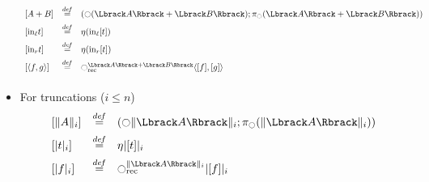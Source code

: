 \begin{itemize}
\[
\begin{array}{lcl}
\left[  A+B \right] &\defeq& \left( \modal(\Lbrack A \Rbrack + \Lbrack B
                        \Rbrack); \pi_\modal(\Lbrack A \Rbrack + \Lbrack B
                        \Rbrack)\right)\\[0.5em]
\left[  \mathrm{in}_\ell t \right] &\defeq& \eta (\mathrm{in}_\ell [t]) \\[0.5em]
\left[  \mathrm{in}_r t \right] &\defeq& \eta (\mathrm{in}_r [t]) \\[0.5em]
\left[ \langle f ,g\rangle\right] &\defeq& \modal_{\mathrm{rec}}^{\Lbrack A\Rbrack +
                                      \Lbrack B\Rbrack} \langle
                                      [f],[g]\rangle\\[0.5em]
\end{array}
\]
\item For truncations ($i\leqslant n$)
\[
\begin{array}{lcl}
  \left[  \|A\|_i \right] &\defeq& (\modal \| \Lbrack A\Rbrack  \|_i;
                                   \pi_\modal(\| \Lbrack A\Rbrack
                                   \|_i)) \\[0.5em]
  \left[ |t|_i \right] &\defeq& \eta |[t]|_i \\[0.5em]
  \left[ |f|_i \right] &\defeq& \modal_{\mathrm{rec}}^{\| \Lbrack
                                  A\Rbrack  \|_i} | [f] |_i
\end{array}
\]

\end{itemize}

